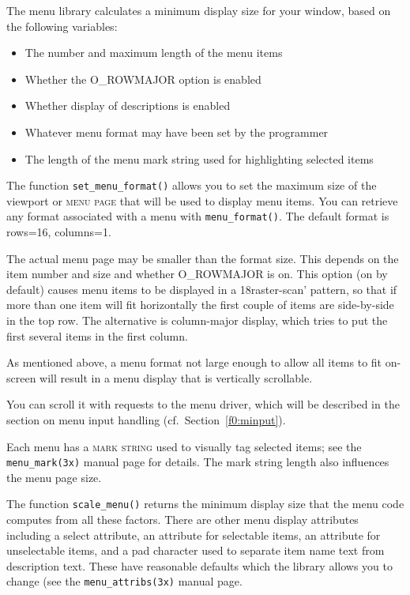 \label{f0:mdisplay}The menu library calculates a minimum display size for your window, based
on the following variables:
\begin{itemize}
\item The number and maximum length of the menu items
\item Whether the O\_ROWMAJOR option is enabled
\item Whether display of descriptions is enabled
\item Whatever menu format may have been set by the programmer
\item The length of the menu mark string used for highlighting selected items
\end{itemize}
The function \texttt{set\_menu\_format()} allows you to set the
maximum size of the viewport or \textsc{menu page} that will be used
to display menu items.  You can retrieve any format associated with a
menu with \texttt{menu\_format()}. The default format is rows=16,
columns=1. 

The actual menu page may be smaller than the format size.  This depends
on the item number and size and whether O\_ROWMAJOR is on.  This option
(on by default) causes menu items to be displayed in a \char18raster-scan'
pattern, so that if more than one item will fit horizontally the first
couple of items are side-by-side in the top row.  The alternative is
column-major display, which tries to put the first several items in
the first column. 

As mentioned above, a menu format not large enough to allow all items to fit
on-screen will result in a menu display that is vertically scrollable. 

You can scroll it with requests to the menu driver, which will be described
in the section on menu input handling (cf.\ Section~\ref{f0:minput}). 

Each menu has a \textsc{mark string} used to visually tag selected items;
see the \texttt{menu\_mark(3x)} manual page for details.  The mark
string length also influences the menu page size. 

The function \texttt{scale\_menu()} returns the minimum display size
that the menu code computes from all these factors.
There are other menu display attributes including a select attribute,
an attribute for selectable items, an attribute for unselectable items,
and a pad character used to separate item name text from description
text.  These have reasonable defaults which the library allows you to
change (see the \texttt{menu\_attribs(3x)} manual page.

